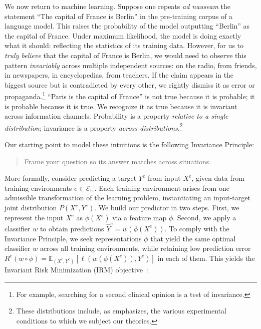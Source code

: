 We now return to machine learning. Suppose one repeats \emph{ad nauseam} the statement ``The capital of France is Berlin'' in the pre-training corpus of a language model. This raises the probability of the model outputting ``Berlin'' as the capital of France. Under maximum likelihood, the model is doing exactly what it should: reflecting the statistics of its training data. However, for us to \emph{truly believe} that the capital of France is Berlin, we would need to observe this pattern \emph{invariably} across multiple independent sources: on the radio, from friends, in newspapers, in encyclopedias, from teachers. If the claim appears in the biggest source but is contradicted by every other, we rightly dismiss it as error or propaganda.\footnote{For example, searching for a second clinical opinion is a test of invariance.} ``Paris is the capital of France'' is not true because it is probable; it is probable because it is true. We recognize it as true because it is invariant across information channels. Probability is a property \emph{relative to a single distribution}; invariance is a property \emph{across distributions}.\footnote{These distributions include, as \citet{cartwright1983} emphasizes, the various experimental conditions to which we subject our theories.}

Our starting point to model these intuitions is the following Invariance Principle:

\begin{quote}
    Frame your question so its answer matches across situations. \citep{tip}
\end{quote}

More formally, consider predicting a target $Y^e$ from input $X^e$, given data from training environments $e \in \mathcal{E}_\text{tr}$. Each training environment arises from one admissible transformation of the learning problem, instantiating an input-target joint distribution $P(X^e, Y^e)$. We build our predictor in two steps. First, we represent the input $X^e$ as $\phi(X^e)$ via a feature map $\phi$. Second, we apply a classifier $w$ to obtain predictions $\hat{Y}^e = w(\phi(X^e))$. To comply with the Invariance Principle, we seek representations $\phi$ that yield the same optimal classifier $w$ across all training environments, while retaining low prediction error $R^e(w \circ \phi) = \mathbb{E}_{(X^e, Y^e)}\left[\ell(w(\phi(X^e)), Y^e)\right]$ in each of them. This yields the Invariant Risk Minimization (IRM) objective~\citep{arjovsky2019}:

